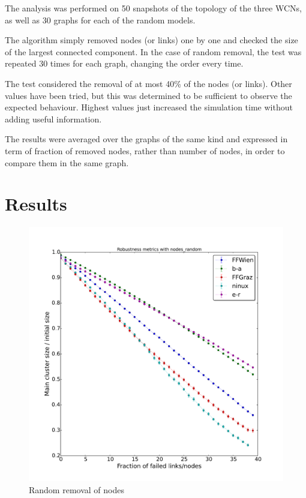 \documentclass[a4paper,11pt,twoside,openleft]{memoir}
\begin{document}
The analysis was performed on 50 snapshots of the topology of the three
WCNs, as well as 30 graphs for each of the random models.

The algorithm simply removed nodes (or links) one by one and checked the
size of the largest connected component. In the case of random removal,
the test was repeated 30 times for each graph, changing the order every
time.

The test considered the removal of at most 40\% of the nodes (or links).
Other values have been tried, but this was determined to be sufficient
to observe the expected behaviour. Highest values just increased the
simulation time without adding useful information.

The results were averaged over the graphs of the same kind and expressed
in term of fraction of removed nodes, rather than number of nodes, in
order to compare them in the same graph.

\section{Results}\label{results}

\begin{figure}[htbp]
\centering
\includegraphics{graphs/nodes_random_robustness}
\caption{Random removal of nodes}
\label{fig:node_rand}
\end{figure}
\end{document}
